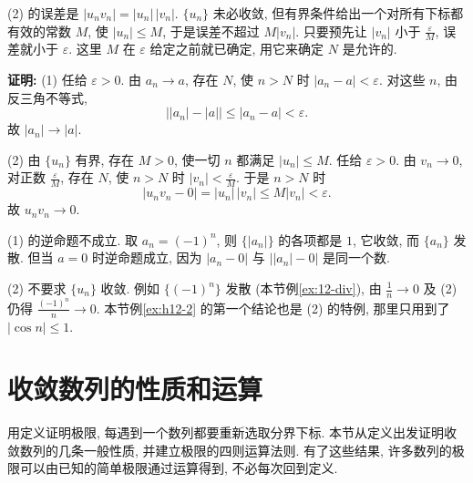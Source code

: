 \documentclass[UTF8,openany]{ctexbook}
\theoremstyle{chinesetextbook}
\newenvironment{cnproof}{\par\indent\textbf{证明:} \ignorespaces}{\par}
\begin{document}
(2) 的误差是 $|u_nv_n|=|u_n|\,|v_n|$. $\{u_n\}$ 未必收敛, 但有界条件给出一个对所有下标都有效的常数 $M$, 使 $|u_n|\le M$, 于是误差不超过 $M|v_n|$. 只要预先让 $|v_n|$ 小于 $\displaystyle\frac\varepsilon M$, 误差就小于 $\varepsilon$. 这里 $M$ 在 $\varepsilon$ 给定之前就已确定, 用它来确定 $N$ 是允许的.
\begin{cnproof}
(1) 任给 $\varepsilon>0$. 由 $a_n\to a$, 存在 $N$, 使 $n>N$ 时 $|a_n-a|<\varepsilon$. 对这些 $n$, 由反三角不等式,
\[
\bigl||a_n|-|a|\bigr|\le|a_n-a|<\varepsilon.
\]
故 $|a_n|\to|a|$.

(2) 由 $\{u_n\}$ 有界, 存在 $M>0$, 使一切 $n$ 都满足 $|u_n|\le M$. 任给 $\varepsilon>0$. 由 $v_n\to0$, 对正数 $\displaystyle\frac\varepsilon M$, 存在 $N$, 使 $n>N$ 时 $\displaystyle|v_n|<\frac\varepsilon M$. 于是 $n>N$ 时
\[
|u_nv_n-0|=|u_n|\,|v_n|\le M|v_n|<\varepsilon.
\]
故 $u_nv_n\to0$.
\end{cnproof}
(1) 的逆命题不成立. 取 $a_n=(-1)^n$, 则 $\{|a_n|\}$ 的各项都是 $1$, 它收敛, 而 $\{a_n\}$ 发散. 但当 $a=0$ 时逆命题成立, 因为 $|a_n-0|$ 与 $\bigl||a_n|-0\bigr|$ 是同一个数.

(2) 不要求 $\{u_n\}$ 收敛. 例如 $\{(-1)^n\}$ 发散 (本节例\ref{ex:12-div}), 由 $\displaystyle\frac1n\to0$ 及 (2) 仍得 $\displaystyle\frac{(-1)^n}n\to0$. 本节例\ref{ex:h12-2} 的第一个结论也是 (2) 的特例, 那里只用到了 $|\cos n|\le1$.
\section{收敛数列的性质和运算}
用定义证明极限, 每遇到一个数列都要重新选取分界下标. 本节从定义出发证明收敛数列的几条一般性质, 并建立极限的四则运算法则. 有了这些结果, 许多数列的极限可以由已知的简单极限通过运算得到, 不必每次回到定义.
\end{document}
